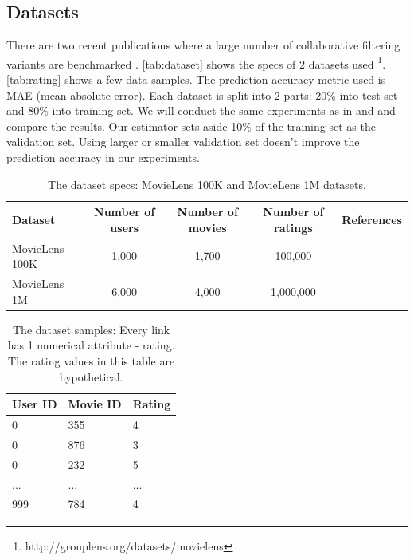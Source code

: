 \documentclass{article}
\begin{document}
\subsection{Datasets}
There are two recent publications where a large number of collaborative 
filtering variants are benchmarked \cite{hwang2016efficient} 
\cite{polatidis2016multi}. 
\autoref{tab:dataset} shows the specs of 2 datasets used
\cite{harper2015movielens} \footnote{http://grouplens.org/datasets/movielens}.
\autoref{tab:rating} shows a few data samples.
The prediction accuracy metric used is MAE (mean absolute error).
Each dataset is split into 2 parts: 20\% into test set and 80\% 
into training set.
We will conduct the same experiments as in \cite{hwang2016efficient} and  
\cite{polatidis2016multi} and compare the results.
Our estimator sets aside 10\% of the training set as the validation set.
Using larger or smaller validation set doesn't improve the prediction accuracy 
in our experiments.
\begin{table}[h]
	\centering
	\caption{The dataset specs: MovieLens 100K and MovieLens 1M datasets.}
	\begin{tabularx}{\textwidth}{ |X|c|c|c|c| }  \hline
		\textbf{Dataset} & \textbf{Number of users} & \textbf{Number of movies} 
		& \textbf{Number of ratings} & \textbf{References} \\ \hline
		MovieLens 100K & 1,000 & 1,700 & 100,000 & \cite{hwang2016efficient} \\ 
		\hline
		MovieLens 1M & 6,000 & 4,000 & 1,000,000 & \cite{polatidis2016multi} \\ 
		\hline
	\end{tabularx}
	\label{tab:dataset}
\end{table}
\begin{table}[h]
	\centering
	\caption{The dataset samples: Every link has 1 numerical attribute - 
		rating. The rating values in this table are hypothetical.}
	\begin{tabularx}{0.5\textwidth}{ |X|X|X| }  \hline
		\textbf{User ID} & \textbf{Movie ID} & \textbf{Rating} \\ \hline
		0 & 355 & 4 \\ \hline
		0 & 876 & 3 \\ \hline
		0 & 232 & 5 \\ \hline
		... & ... & ... \\ \hline
		999 & 784 & 4 \\ \hline
	\end{tabularx}
	\label{tab:rating}
\end{table}
\end{document}
